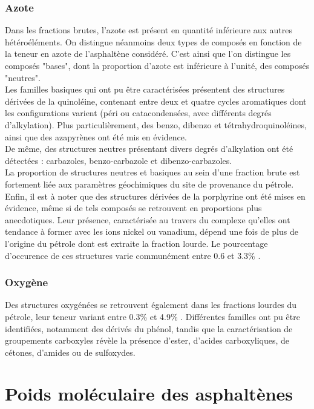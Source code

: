 	\subsubsection{Azote}
	Dans les fractions brutes, l'azote est présent en quantité inférieure aux autres hétéroéléments. On distingue néanmoins deux types de composés en fonction de la teneur en azote de l'asphaltène considéré. C'est ainsi que l'on distingue les composés "bases", dont la proportion d'azote est inférieure à l'unité, des composés "neutres". \\
	Les familles basiques qui ont pu être caractérisées présentent des structures dérivées de la quinoléine, contenant entre deux et quatre cycles aromatiques dont les configurations varient (péri ou catacondensées, avec différents degrés d'alkylation). Plus particulièrement, des benzo, dibenzo et tétrahydroquinoléines, ainsi que des azapyrènes ont été mis en évidence. \\ 
	De même, des structures neutres présentant divers degrés d'alkylation ont été détectées : carbazoles, benzo-carbazole et dibenzo-carbazoles. \\
	La proportion de structures neutres et basiques au sein d'une fraction brute est fortement liée aux paramètres géochimiques du site de provenance du pétrole. 
	Enfin, il est à noter que des structures dérivées de la porphyrine ont été mises en évidence, même si de tels composés se retrouvent en proportions plus anecdotiques. Leur présence, caractérisée au travers du complexe qu'elles ont tendance à former avec les ions nickel ou vanadium, dépend une fois de plus de l'origine du pétrole dont est extraite la fraction lourde. Le pourcentage d'occurence de ces structures varie communément entre 0.6 et 3.3\% \cite{merdrignac2007physicochemical, speight2004petroleum}.
	
	\subsubsection{Oxygène}
	Des structures oxygénées se retrouvent également dans les fractions lourdes du pétrole, leur teneur variant entre 0.3\% et 4.9\% \cite{speight2004petroleum}. Différentes familles ont pu être identifiées, notamment des dérivés du phénol, tandis que la caractérisation de groupements carboxyles révèle la présence d'ester, d'acides carboxyliques, de cétones, d'amides ou de sulfoxydes.
	
	
	\bigskip
	
	\section{Poids moléculaire des asphaltènes}
	
